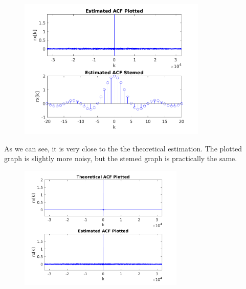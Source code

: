 \documentclass[a4paper,11pt]{article}
\begin{document}
\begin{figure}[!hp]
    \begin{center}
      \includegraphics[width=0.8\textwidth]{images/study1/r_hd_es.png}
    \end{center}
\end{figure}

As we can see, it is very close to the the theoretical estimation. The plotted
graph is slightly more noisy, but the stemed graph is practically the same.

\newpage

\begin{figure}[!hp]
    \begin{center}
      \includegraphics[width=0.7\textwidth]{images/study1/comp_r_hd_plot.png}
    \end{center}
\end{figure}
\end{document}
